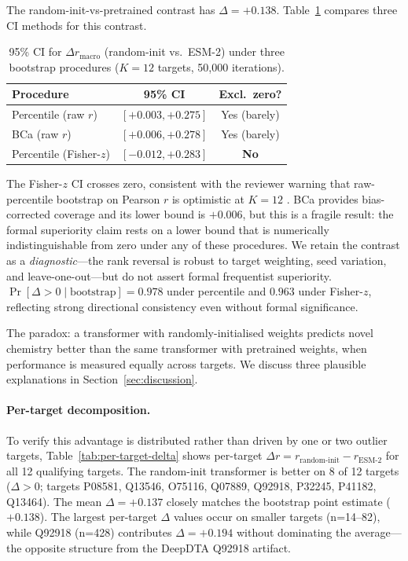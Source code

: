 \documentclass[11pt,a4paper]{article}
\begin{document}
The random-init-vs-pretrained contrast has $\Delta = +0.138$.
Table~\ref{tab:ci-methods} compares three CI methods for this contrast.

\begin{table}[h]
\centering
\caption{95\% CI for $\Delta r_\text{macro}$ (random-init vs.\ ESM-2)
under three bootstrap procedures ($K=12$ targets, 50{,}000 iterations).}
\label{tab:ci-methods}
\small
\begin{tabular}{lcc}
\toprule
\textbf{Procedure} & \textbf{95\% CI} & \textbf{Excl.\ zero?} \\
\midrule
Percentile (raw $r$)         & $[+0.003, +0.275]$ & Yes (barely) \\
BCa (raw $r$)                & $[+0.006, +0.278]$ & Yes (barely) \\
Percentile (Fisher-$z$)      & $[-0.012, +0.283]$ & \textbf{No} \\
\bottomrule
\end{tabular}
\end{table}

The Fisher-$z$ CI crosses zero, consistent with the reviewer warning that
raw-percentile bootstrap on Pearson $r$ is optimistic at $K=12$
\citep{mackinnon2023fast}.
BCa provides bias-corrected coverage and its lower bound is $+0.006$, but
this is a fragile result: the formal superiority claim rests on a lower bound
that is numerically indistinguishable from zero under any of these procedures.
We retain the contrast as a \emph{diagnostic}---the rank reversal is robust
to target weighting, seed variation, and leave-one-out---but do not assert
formal frequentist superiority.
$\Pr[\Delta > 0 \mid \text{bootstrap}] = 0.978$ under percentile and $0.963$
under Fisher-$z$, reflecting strong directional consistency even without
formal significance.

The paradox: a transformer with randomly-initialised weights predicts novel
chemistry better than the same transformer with pretrained weights, when
performance is measured equally across targets.
We discuss three plausible explanations in Section~\ref{sec:discussion}.

\paragraph{Per-target decomposition.}
To verify this advantage is distributed rather than driven by one or two
outlier targets, Table~\ref{tab:per-target-delta} shows per-target
$\Delta r = r_\text{random-init} - r_\text{ESM-2}$ for all 12 qualifying targets.
The random-init transformer is better on 8 of 12 targets ($\Delta > 0$;
targets P08581, Q13546, O75116, Q07889, Q92918, P32245, P41182, Q13464).
The mean $\Delta = +0.137$ closely matches the bootstrap point estimate ($+0.138$).
The largest per-target $\Delta$ values occur on smaller targets (n=14--82),
while Q92918 (n=428) contributes $\Delta = +0.194$ without dominating the
average---the opposite structure from the DeepDTA Q92918 artifact.
\end{document}
